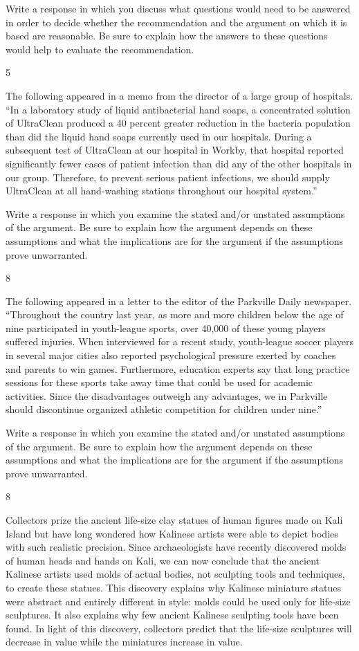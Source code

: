 \documentclass[]{article}
\begin{document}
Write a response in which you discuss what questions would need to be
answered in order to decide whether the recommendation and the argument
on which it is based are reasonable. Be sure to explain how the answers
to these questions would help to evaluate the recommendation.

5

The following appeared in a memo from the director of a large group of
hospitals. ``In a laboratory study of liquid antibacterial hand soaps, a
concentrated solution of UltraClean produced a 40 percent greater
reduction in the bacteria population than did the liquid hand soaps
currently used in our hospitals. During a subsequent test of UltraClean
at our hospital in Workby, that hospital reported significantly fewer
cases of patient infection than did any of the other hospitals in our
group. Therefore, to prevent serious patient infections, we should
supply UltraClean at all hand-washing stations throughout our hospital
system.''

Write a response in which you examine the stated and/or unstated
assumptions of the argument. Be sure to explain how the argument depends
on these assumptions and what the implications are for the argument if
the assumptions prove unwarranted.

8

The following appeared in a letter to the editor of the Parkville Daily
newspaper. ``Throughout the country last year, as more and more children
below the age of nine participated in youth-league sports, over 40,000
of these young players suffered injuries. When interviewed for a recent
study, youth-league soccer players in several major cities also reported
psychological pressure exerted by coaches and parents to win games.
Furthermore, education experts say that long practice sessions for these
sports take away time that could be used for academic activities. Since
the disadvantages outweigh any advantages, we in Parkville should
discontinue organized athletic competition for children under nine.''

Write a response in which you examine the stated and/or unstated
assumptions of the argument. Be sure to explain how the argument depends
on these assumptions and what the implications are for the argument if
the assumptions prove unwarranted.

8

Collectors prize the ancient life-size clay statues of human figures
made on Kali Island but have long wondered how Kalinese artists were
able to depict bodies with such realistic precision. Since
archaeologists have recently discovered molds of human heads and hands
on Kali, we can now conclude that the ancient Kalinese artists used
molds of actual bodies, not sculpting tools and techniques, to create
these statues. This discovery explains why Kalinese miniature statues
were abstract and entirely different in style: molds could be used only
for life-size sculptures. It also explains why few ancient Kalinese
sculpting tools have been found. In light of this discovery, collectors
predict that the life-size sculptures will decrease in value while the
miniatures increase in value.
\end{document}
